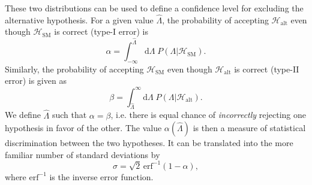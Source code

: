 \documentclass{JHEP3}
\newcommand{\SM}{\mathrm{SM}}
\newcommand{\alt}{\mathrm{alt}}
\def\hLambda {\hat{\Lambda}}
\def\erf{\mathrm{erf}}
\def\HSM{\mathcal{H}_{\mathrm{SM}}}
\def\Halt{\mathcal{H}_{\mathrm{alt}}}
\begin{document}
These two distributions can be used to define a confidence level for excluding the alternative hypothesis.
For a given value $\hat{\Lambda}$, the probability of accepting $\mathcal{H}_{\alt}$ even though $\mathcal{H}_{\SM}$ is correct (type-I error) is
\begin{equation}
    \alpha = \int^{\hLambda}_{-\infty} \mathrm{d}\Lambda \; P(\Lambda | {\HSM}).
\end{equation}
Similarly, the probability of accepting $\mathcal{H}_{\SM}$ even though $\mathcal{H}_{\alt}$ is correct (type-II error) is given as 
\begin{equation}
    \beta = \int_{\hLambda}^{\infty} \mathrm{d}\Lambda \; P(\Lambda|\Halt).
\end{equation}
We define $\hLambda$ such that $\alpha=\beta$, i.e. there is equal chance of {\it incorrectly} rejecting one hypothesis in favor of the other. 
The value $\alpha(\hLambda)$ is then a measure of statistical discrimination between the two hypotheses. 
It can be translated into the more familiar number of standard deviations by 
\begin{equation} \label{alphatosig}
    \sigma = \sqrt{2} \, \erf^{-1}(1-\alpha),
\end{equation}
where $\erf^{-1}$ is the inverse error function. 
\end{document}
